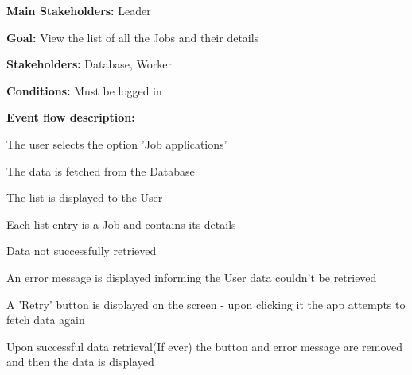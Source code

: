 				\noindent {}
				\begin{packed_item}
					\item \textbf{Main Stakeholders:} Leader
					\item \textbf{Goal:} View the list of all the Jobs and their details
					\item \textbf{Stakeholders: } Database, Worker
					\item \textbf{Conditions: } Must be logged in
					\item \textbf{Event flow description: }
					\begin{packed_enum}
						\item The user selects the option 'Job applications'
						\item The data is fetched from the Database
						\item The list is displayed to the User
						\item Each list entry is a Job and contains its details
					\end{packed_enum}
					
					\begin{packed_item}
						\item[1.a] Data not successfully retrieved
						\item[] \begin{packed_enum}
							\item An error message is displayed informing the User data couldn't be retrieved
							\item A 'Retry' button is displayed on the screen - upon clicking it the app attempts to fetch data again
							\item Upon successful data retrieval(If ever) the button and error message are removed and then the data is displayed
						\end{packed_enum}
					\end{packed_item}
				\end{packed_item}
			
